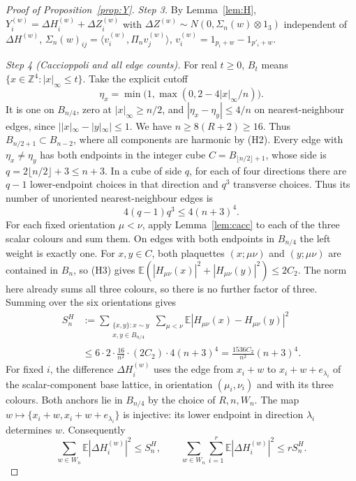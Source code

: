 \documentclass[11pt,a4paper]{article}
\theoremstyle{plain}
\theoremstyle{definition}
\theoremstyle{remark}
\numberwithin{equation}{section}
\newcommand{\Z}{\mathbb{Z}}
\newcommand{\E}{\mathbb{E}}
\begin{document}
\begin{proof}[Proof of Proposition~\ref{prop:Y}]
\emph{Step 3.} By Lemma~\ref{lem:H}, $Y^{(w)}_i=\Delta H^{(w)}_i+\Delta Z^{(w)}_i$ with $\Delta Z^{(w)}\sim N(0,\Sigma_n(w)\otimes1_3)$ independent of
$\Delta H^{(w)}$, $\Sigma_n(w)_{ij}=\langle v^{(w)}_i,\Pi_nv^{(w)}_j\rangle$, $v^{(w)}_i=1_{p_i+w}-1_{p'_i+w}$.

\emph{Step 4 (Caccioppoli and all edge counts).}
For real $t\ge0$, $B_t$ means $\{x\in\Z^4:|x|_\infty\le t\}$.
Take the explicit cutoff
\[
\eta_x=\min\bigl(1,\max(0,2-4|x|_\infty/n)\bigr).
\]
It is one on $B_{n/4}$, zero at $|x|_\infty\ge n/2$, and
$|\eta_x-\eta_y|\le4/n$ on nearest-neighbour edges, since $||x|_\infty-|y|_\infty|\le1$.
We have $n\ge8(R+2)\ge16$. Thus $B_{n/2+1}\subset B_{n-2}$, where all components are harmonic by (H2).
Every edge with $\eta_x\ne\eta_y$ has both endpoints in the integer cube
$C=B_{\lfloor n/2\rfloor+1}$, whose side is $q=2\lfloor n/2\rfloor+3\le n+3$.
In a cube of side $q$, for each of four directions there are $q-1$ lower-endpoint choices in that direction and $q^3$ transverse
choices. Thus its number of unoriented nearest-neighbour edges is
\[
4(q-1)q^3\le4(n+3)^4.
\]
For each fixed orientation $\mu<\nu$, apply Lemma~\ref{lem:cacc} to each of the three scalar colours and sum them.
On edges with both endpoints in $B_{n/4}$ the left weight is exactly one.
For $x,y\in C$, both plaquettes $(x;\mu\nu)$ and $(y;\mu\nu)$ are contained in $B_n$, so (H3) gives
$\E(|H_{\mu\nu}(x)|^2+|H_{\mu\nu}(y)|^2)\le2C_2$.
The norm here already sums all three colours, so there is no further factor of three.
Summing over the six orientations gives
\begin{equation*}\tag{Y.4}\label{eq:Y-caccioppoli-count}
\begin{split}
S_n^H&:=\sum_{\substack{\{x,y\}:x\sim y\\x,y\in B_{n/4}}}
             \sum_{\mu<\nu}\E|H_{\mu\nu}(x)-H_{\mu\nu}(y)|^2\\
&\le 6\cdot2\cdot\frac{16}{n^2}\cdot(2C_2)\cdot4(n+3)^4
 =\frac{1536C_2}{n^2}(n+3)^4.
\end{split}
\end{equation*}
For fixed $i$, the difference $\Delta H_i^{(w)}$ uses the edge from $x_i+w$ to $x_i+w+e_{\lambda_i}$ of the scalar-component
base lattice, in orientation $(\mu_i,\nu_i)$ and with its three colours.
Both anchors lie in $B_{n/4}$ by the choice of $R,n,W_n$.
The map $w\mapsto\{x_i+w,x_i+w+e_{\lambda_i}\}$ is injective: its lower endpoint in direction $\lambda_i$ determines $w$.
Consequently
\[
\sum_{w\in W_n}\E|\Delta H_i^{(w)}|^2\le S_n^H,
\qquad
\sum_{w\in W_n}\sum_{i=1}^r\E|\Delta H_i^{(w)}|^2\le rS_n^H.
\]
\end{proof}
\end{document}
